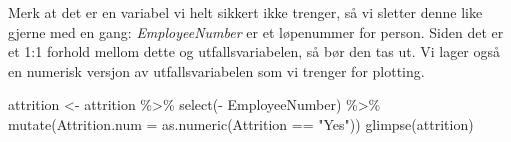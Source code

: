\documentclass[
  letterpaper,
  DIV=11,
  numbers=noendperiod]{scrreprt}
\newenvironment{Shaded}{\begin{snugshade}}{\end{snugshade}}
\newcommand{\AttributeTok}[1]{\textcolor[rgb]{0.40,0.45,0.13}{#1}}
\newcommand{\FunctionTok}[1]{\textcolor[rgb]{0.28,0.35,0.67}{#1}}
\newcommand{\NormalTok}[1]{\textcolor[rgb]{0.00,0.23,0.31}{#1}}
\newcommand{\OtherTok}[1]{\textcolor[rgb]{0.00,0.23,0.31}{#1}}
\newcommand{\SpecialCharTok}[1]{\textcolor[rgb]{0.37,0.37,0.37}{#1}}
\newcommand{\StringTok}[1]{\textcolor[rgb]{0.13,0.47,0.30}{#1}}
\begin{document}
Merk at det er en variabel vi helt sikkert ikke trenger, så vi sletter
denne like gjerne med en gang: \emph{EmployeeNumber} er et løpenummer
for person. Siden det er et 1:1 forhold mellom dette og
utfallsvariabelen, så bør den tas ut. Vi lager også en numerisk versjon
av utfallsvariabelen som vi trenger for plotting.

\begin{Shaded}
\begin{Highlighting}[]
\NormalTok{attrition }\OtherTok{\textless{}{-}}\NormalTok{ attrition }\SpecialCharTok{\%\textgreater{}\%}
  \FunctionTok{select}\NormalTok{(}\SpecialCharTok{{-}}\NormalTok{ EmployeeNumber) }\SpecialCharTok{\%\textgreater{}\%}
  \FunctionTok{mutate}\NormalTok{(}\AttributeTok{Attrition.num =} \FunctionTok{as.numeric}\NormalTok{(Attrition }\SpecialCharTok{==} \StringTok{"Yes"}\NormalTok{))}
\FunctionTok{glimpse}\NormalTok{(attrition)}
\end{Highlighting}
\end{Shaded}
\end{document}
